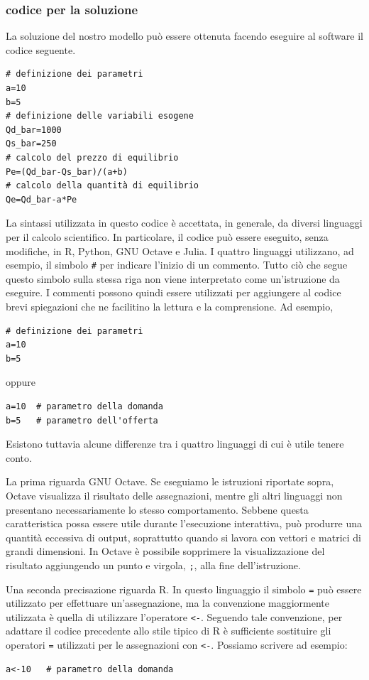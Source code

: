 \subsubsection{codice per la soluzione}

La soluzione del nostro modello può essere ottenuta facendo eseguire al software
il codice seguente.

\begin{verbatim}
# definizione dei parametri
a=10
b=5
# definizione delle variabili esogene
Qd_bar=1000
Qs_bar=250
# calcolo del prezzo di equilibrio
Pe=(Qd_bar-Qs_bar)/(a+b)
# calcolo della quantità di equilibrio
Qe=Qd_bar-a*Pe
\end{verbatim}

La sintassi utilizzata in questo codice è accettata, in generale, da diversi
linguaggi per il calcolo scientifico. In particolare, il codice può essere
eseguito, senza modifiche, in R, Python, GNU Octave e Julia. I quattro
linguaggi utilizzano, ad esempio, il simbolo \verb+#+ per indicare l'inizio
di un commento. Tutto ciò che segue questo simbolo sulla stessa
riga non viene interpretato come un'istruzione da eseguire. I commenti
possono quindi essere utilizzati per aggiungere al codice brevi spiegazioni
che ne facilitino la lettura e la comprensione. Ad esempio,
\begin{verbatim}
# definizione dei parametri
a=10
b=5
\end{verbatim}
oppure
\begin{verbatim}
a=10  # parametro della domanda
b=5   # parametro dell'offerta
\end{verbatim}
Esistono tuttavia alcune differenze tra i quattro linguaggi di cui è utile
tenere conto.

La prima riguarda GNU Octave. Se eseguiamo le istruzioni riportate sopra,
Octave visualizza il risultato delle assegnazioni, mentre gli altri linguaggi
non presentano necessariamente lo stesso comportamento. Sebbene questa
caratteristica possa essere utile durante l'esecuzione interattiva, può
produrre una quantità eccessiva di output, soprattutto quando si lavora con
vettori e matrici di grandi dimensioni. In Octave è possibile sopprimere la
visualizzazione del risultato aggiungendo un punto e virgola, \verb+;+,
alla fine dell'istruzione.

Una seconda precisazione riguarda R. In questo linguaggio il simbolo
\verb+=+ può essere utilizzato per effettuare un'assegnazione, ma la
convenzione maggiormente utilizzata è quella di utilizzare l'operatore \verb+<-+. Seguendo tale
convenzione, per adattare il codice precedente allo stile tipico di R è
sufficiente sostituire gli operatori \verb+=+ utilizzati per le assegnazioni
con \verb+<-+. Possiamo scrivere ad esempio:
\begin{verbatim}
a<-10   # parametro della domanda
\end{verbatim}

